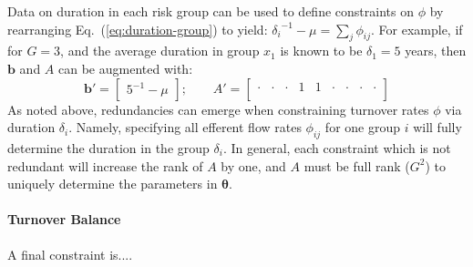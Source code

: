 Data on duration in each risk group can be used to define constraints on $\phi$ by
rearranging Eq.~(\ref{eq:duration-group}) to yield:
${\delta_{i}}^{-1} - \mu = \sum_{j}{\phi_{ij}}$.
For example, if for $G = 3$,
and the average duration in group $x_1$ is known to be $\delta_1 = 5$ years,
then $\bm{b}$ and $A$ can be augmented with:
\begin{equation}
\bm{b}' = \left[\begin{array}{c}
{5}^{-1} - \mu
\end{array}\right];\qquad
A' = \left[\begin{array}{ccccccccc}
\cdot & \cdot & \cdot & 1 & 1 & \cdot & \cdot & \cdot & \cdot \\
\end{array}\right]
\end{equation}
As noted above, redundancies can emerge							%
when constraining turnover rates $\phi$ via duration $\delta_i$.				%
Namely, specifying all efferent flow rates $\phi_{ij}$ for one group $i$
will fully determine the duration in the group $\delta_i$.					%
In general, each constraint which is not redundant will increase the rank of $A$ by one,		%
and $A$ must be full rank ($G^2$) to uniquely determine the parameters in $\bm{\theta}$.
\paragraph{Turnover Balance} 	%
A final constraint is.... %

